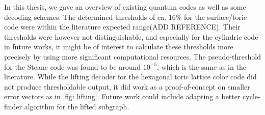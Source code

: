 In this thesis, we gave an overview of existing
quantum codes as well as some decoding schemes.
The determined thresholds of ca. 16\% for the surface/toric code were
within the literature expected range(ADD REFERENCE). 
Their thresholds were however not distinguishable, and
especially for the cylindric code in future works, it might be of interest to 
calculate these thresholds more precisely by using more significant computational
resources.
The pseudo-threshold for the Steane code was found to be around $10^{-5}$, which is
the same as in the literature\cite{steaneThreshold}. 
While the lifting decoder for the hexagonal toric lattice color code did not produce
thresholdable output, it did work as a proof-of-concept on smaller error vectors as in
\ref{fig: lifting}.
Future work could include adapting a better cycle-finder algorithm for the lifted 
subgraph.